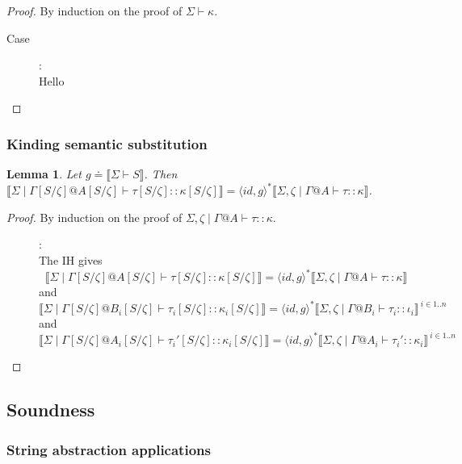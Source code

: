 \documentclass{article}
\newtheorem{lemma}{Lemma}
\newcommand{\sem}[1]{\llbracket #1 \rrbracket}
\begin{document}
\begin{proof}
By induction on the proof of $\Sigma \vdash \kappa$.
\begin{description}
\item[Case \begin{sc}KWF-Str\end{sc}]:~\\
Hello
\end{description}
\end{proof}

\subsubsection*{Kinding semantic substitution}

\begin{lemma}
Let $g \doteq \sem{\Sigma \vdash S}$. Then $\sem{\Sigma \mid \Gamma[S/\zeta] @ A[S/\zeta] \vdash \tau[S/\zeta] :: \kappa[S/\zeta]} = \langle \mathit{id}, g \rangle^* \sem{\Sigma,\zeta \mid \Gamma @ A \vdash \tau :: \kappa}$. 
\end{lemma}

\begin{proof}
By induction on the proof of $\Sigma,\zeta \mid \Gamma @ A \vdash \tau :: \kappa$.

\begin{description}
\item[]:~\\
The IH gives $$\sem{\Sigma \mid \Gamma[S/\zeta] @ A[S/\zeta] \vdash \tau[S/\zeta] :: \kappa[S/\zeta]} = \langle \mathit{id}, g \rangle^* \sem{\Sigma,\zeta \mid \Gamma @ A \vdash \tau :: \kappa}$$ and $$\sem{\Sigma \mid \Gamma[S/\zeta] @ B_i[S/\zeta] \vdash \tau_i[S/\zeta] :: \kappa_i[S/\zeta]} = \langle \mathit{id}, g \rangle^* \sem{\Sigma,\zeta \mid \Gamma @ B_i \vdash \tau_i :: \iota_i}^{~i \in 1..n}$$ and $$\sem{\Sigma \mid \Gamma[S/\zeta] @ A_i[S/\zeta] \vdash \tau_i'[S/\zeta] :: \kappa_i[S/\zeta]} = \langle \mathit{id}, g \rangle^* \sem{\Sigma,\zeta \mid \Gamma @ A_i \vdash \tau_i' :: \kappa_i}^{~i \in 1..n}$$
\end{description}

\end{proof}

\subsection*{Soundness}

\subsubsection*{String abstraction applications}
\end{document}
